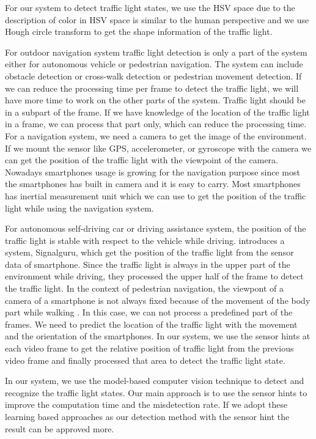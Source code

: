 For our system to detect traffic light states, we use the HSV space due to the description of color in HSV space is similar to the human perspective and we use Hough circle transform to get the shape information of the traffic light. 

For outdoor navigation system traffic light detection is only a part of the system either for autonomous vehicle or pedestrian navigation.
The system can include obstacle detection or cross-walk detection or pedestrian movement detection.
If we can reduce the processing time per frame to detect the traffic light, we will have more time to work on the other parts of the system.
Traffic light should be in a subpart of the frame.
If we have knowledge of the location of the traffic light in a frame, we can process that part only, which can reduce the processing time.
For a navigation system, we need a camera to get the image of the environment.
If we mount the sensor like GPS, accelerometer, or gyroscope  \cite{sensor,sensor2,sensor3} with the camera we can  get the position of the traffic light with the viewpoint of the camera.
Nowadays smartphones usage is growing for the navigation purpose since most the smartphones has built in camera and it is easy to carry.
Most smartphones has inertial measurement unit which we can use to get the position of the traffic light while using the navigation system.

For autonomous self-driving car or driving assistance system, the position of the traffic light is stable with respect to the vehicle while driving.
\cite{signalguru} introduces a system, Signalguru, which get the position of the traffic light from the sensor data of smartphone.
Since the traffic light is always in the upper part of the environment while driving, they processed the upper half of the frame to detect the traffic light.
In the context of pedestrian navigation, the viewpont of a camera of a smartphone is not always fixed because of the movement of the body part while walking \cite{sensor_pedestrian,sensor_pedestrian2}.
In this case, we can not process a predefined part of the frames.
We need to predict the location of the traffic light with the movement and the orientation of the smartphones.
In our system, we use the sensor hints at each video frame to get the relative position of traffic light from the previous video frame and finally processed that area to detect the traffic light state.


In our system, we use the model-based computer vision technique to detect and recognize the traffic light states.
Our main approach is to use the sensor hints to improve the computation time and the misdetection rate.
If we adopt these learning based approaches as our detection method with the sensor hint the result can be approved more.  





